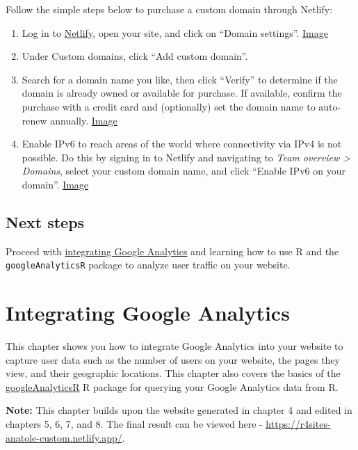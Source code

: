 \documentclass[
]{book}
\begin{document}
Follow the simple steps below to purchase a custom domain through Netlify:

\begin{enumerate}
\def\labelenumi{\arabic{enumi}.}
\item
  Log in to \href{https://app.netlify.com/}{Netlify}, open your site, and click on ``Domain settings''. \href{https://i.imgur.com/ACjNs4w.png}{Image}
\item
  Under Custom domains, click ``Add custom domain''.
\item
  Search for a domain name you like, then click ``Verify'' to determine if the domain is already owned or available for purchase. If available, confirm the purchase with a credit card and (optionally) set the domain name to auto-renew annually. \href{https://i.imgur.com/y2s7wQR.png}{Image}
\item
  Enable IPv6 to reach areas of the world where connectivity via IPv4 is not possible. Do this by signing in to Netlify and navigating to \emph{Team overview \textgreater{} Domains}, select your custom domain name, and click ``Enable IPv6 on your domain''. \href{https://docs.netlify.com/domains-https/netlify-dns/\#ipv6-traffic}{Image}
\end{enumerate}

\hypertarget{next-steps-6}{%
\section{Next steps}\label{next-steps-6}}

Proceed with \protect\hyperlink{content}{integrating Google Analytics} and learning how to use R and the \texttt{googleAnalyticsR} package to analyze user traffic on your website.

\hypertarget{google-analytics}{%
\chapter{Integrating Google Analytics}\label{google-analytics}}

This chapter shows you how to integrate Google Analytics into your website to capture user data such as the number of users on your website, the pages they view, and their geographic locations. This chapter also covers the basics of the \href{https://code.markedmondson.me/googleAnalyticsR/}{googleAnalyticsR} R package for querying your Google Analytics data from R.

\textbf{Note:} This chapter builds upon the website generated in chapter 4 and edited in chapters 5, 6, 7, and 8. The final result can be viewed here - \url{https://r4sites-anatole-custom.netlify.app/}.
\end{document}
